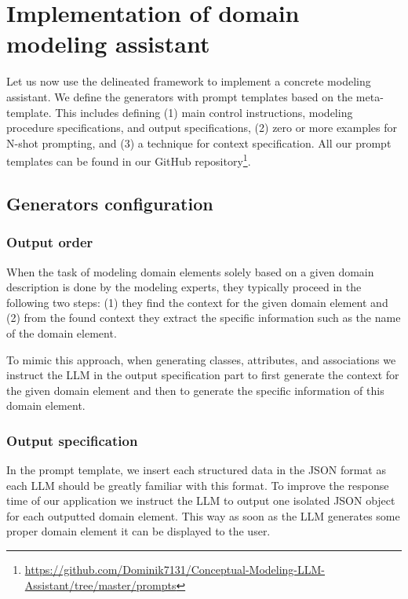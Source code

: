 \chapter{Implementation of domain modeling assistant}

Let us now use the delineated framework to implement a concrete modeling assistant. We define the generators with prompt templates based on the meta-template. This includes defining (1) main control instructions, modeling procedure specifications, and output specifications, (2) zero or more examples for N-shot prompting, and (3) a technique for context specification. All our prompt templates can be found in our GitHub repository\footnote{\url{https://github.com/Dominik7131/Conceptual-Modeling-LLM-Assistant/tree/master/prompts}}.


\section{Generators configuration}


\subsection{Output order}
\label{sec:output_order}

When the task of modeling domain elements solely based on a given domain description is done by the modeling experts, they typically proceed in the following two steps: (1) they find the context for the given domain element and (2) from the found context they extract the specific information such as the name of the domain element.

To mimic this approach, when generating classes, attributes, and associations we instruct the LLM in the output specification part to first generate the context for the given domain element and then to generate the specific information of this domain element.


\subsection{Output specification}

In the prompt template, we insert each structured data in the JSON format as each LLM should be greatly familiar with this format. To improve the response time of our application we instruct the LLM to output one isolated JSON object for each outputted domain element. This way as soon as the LLM generates some proper domain element it can be displayed to the user.


